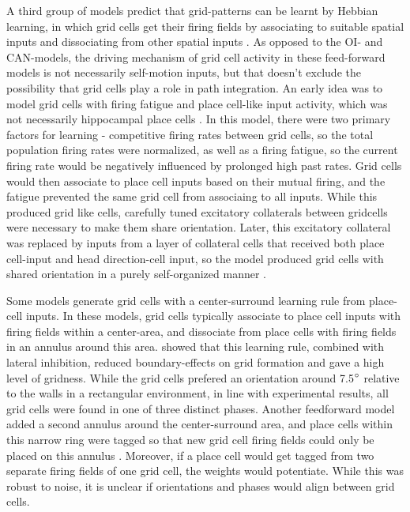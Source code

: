 \documentclass{article}
\begin{document}
    A third group of models predict that grid-patterns can be learnt by Hebbian learning, in which grid cells get their firing fields by associating to suitable spatial inputs and dissociating from other spatial inputs \parencite{Soldatkina2021}. As opposed to the OI- and CAN-models, the driving mechanism of grid cell activity in these feed-forward models is not necessarily self-motion inputs, but that doesn't exclude the possibility that grid cells play a role in path integration. An early idea was to model grid cells with firing fatigue and place cell-like input activity, which was not necessarily hippocampal place cells \parencite{Kropff2008}. In this model, there were two primary factors for learning - competitive firing rates between grid cells, so the total population firing rates were normalized, as well as a firing fatigue, so the current firing rate would be negatively influenced by prolonged high past rates. Grid cells would then associate to place cell inputs based on their mutual firing, and the fatigue prevented the same grid cell from associaing to all inputs. While this produced grid like cells, carefully tuned excitatory collaterals between gridcells were necessary to make them share orientation.
    Later, this excitatory collateral was replaced by inputs from a layer of collateral cells that received both place cell-input and head direction-cell input, so the model produced grid cells with shared orientation in a purely self-organized manner \parencite{Si2013}.

    Some models generate grid cells with a center-surround learning rule from place-cell inputs. In these models, grid cells typically associate to place cell inputs with firing fields within a center-area, and dissociate from place cells with firing fields in an annulus around this area. \cite{Mercado2020} showed that this learning rule, combined with lateral inhibition, reduced boundary-effects on grid formation and gave a high level of gridness. While the grid cells prefered an orientation around 7.5\(\degree\) relative to the walls in a rectangular environment, in line with experimental results, all grid cells were found in one of three distinct phases. Another feedforward model added a second annulus around the center-surround area, and place cells within this narrow ring were tagged so that new grid cell firing fields could only be placed on this annulus \parencite{Castro2014}. Moreover, if a place cell would get tagged from two separate firing fields of one grid cell, the weights would potentiate. While this was robust to noise, it is unclear if orientations and phases would align between grid cells.
\end{document}
